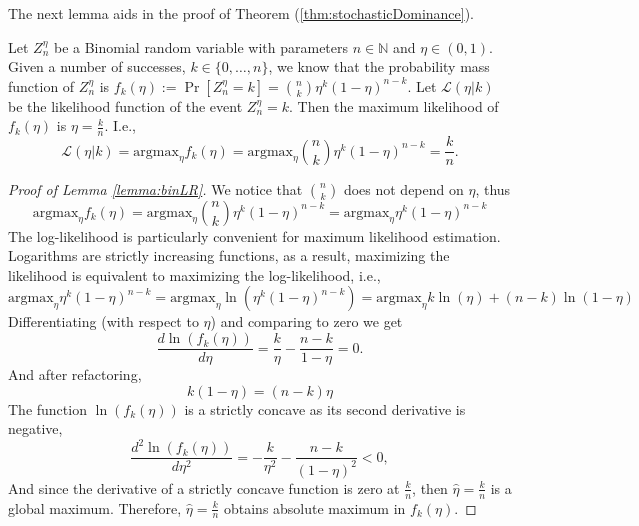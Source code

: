 The next lemma aids in the proof of Theorem (\ref{thm:stochasticDominance}).
\begin{lemma}\label{lemma:binLR}
Let $Z_n^{\eta}$ be a Binomial random variable with parameters $n\in \mathbb{N}$ and $\eta\in(0,1)$. Given a number of successes, $k\in\{0,\dots,n\}$, we know that the probability mass function of $Z_n^{\eta}$ is $f_k(\eta):=\Pr[Z_n^{\eta}=k]={n\choose k}\eta^k(1-\eta)^{n-k}$. Let $\mathcal{L}(\eta|k)$ be the likelihood function of the event $Z_n^{\eta}=k$. Then the maximum likelihood of $f_k(\eta)$ is $\eta=\frac{k}{n}$. I.e., 
\[
\mathcal{L}(\eta|k)=
\text{argmax}_{\eta}f_k(\eta)=
\text{argmax}_{\eta}{n\choose k}\eta^k(1-\eta)^{n-k}=\frac{k}{n}.
\]
\end{lemma}

\begin{proof}[Proof of Lemma \ref{lemma:binLR}]

We notice that ${n\choose k}$ does not depend on $\eta$, thus
\[
\text{argmax}_{\eta}f_k(\eta)=
\text{argmax}_{\eta}{n\choose k}\eta^k(1-\eta)^{n-k}=\text{argmax}_{\eta}\eta^k(1-\eta)^{n-k}\]
The log-likelihood is particularly convenient for maximum likelihood estimation. Logarithms are strictly increasing functions, as a result, maximizing the likelihood is equivalent to maximizing the log-likelihood, i.e.,
\[
\text{argmax}_{\eta}\eta^k(1-\eta)^{n-k}=\text{argmax}_{\eta}\ln(\eta^k(1-\eta)^{n-k})=\text{argmax}_{\eta}k\ln(\eta)+(n-k)\ln(1-\eta)
\]
Differentiating (with respect to $\eta$) and comparing to zero we get
\[
\frac{d\ln(f_k(\eta))}{d\eta}=\frac{k}{\eta}-\frac{n-k}{1-\eta}=0.
\]
And after refactoring,
\[
k(1-\eta)=(n-k)\eta
\]
The function $\ln(f_k(\eta))$ is a strictly concave as its second derivative is negative,
\[
\frac{d^2\ln(f_k(\eta))}{d\eta^2}=-\frac{k}{\eta^2}-\frac{n-k}{(1-\eta)^2}<0,
\]
And since the derivative of a strictly concave function is zero at $\frac{k}{n}$, then $\hat{\eta}=\frac{k}{n}$ is a global maximum.
Therefore, $\hat{\eta}=\frac{k}{n}$ obtains absolute maximum in $f_k(\eta)$.
\end{proof}


